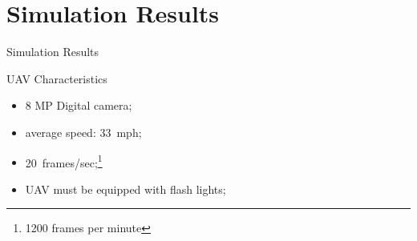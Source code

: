 \section{Simulation Results}

\begin{frame}{Simulation Results}
    \begin{block}{UAV Characteristics}
        \begin{itemize}
            \item 8 MP Digital camera;
            \item average speed: \SI{33}{mph};
            \item \SI{20}{frames/sec};\footnote{1200 frames per minute}
            \item UAV must be equipped with flash lights;
        \end{itemize}
    \end{block}
\end{frame}

